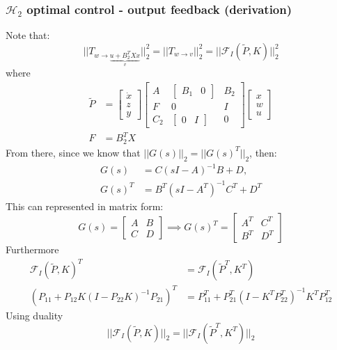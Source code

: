 \documentclass{article}
\begin{document}
\subsubsection{\texorpdfstring{$\mathcal{H}_2$}. optimal control - output feedback (derivation)}
Note that:
\[
|| T_{w \rightarrow \underbrace{u + B_2^TXx}_{v}}||_2^2 = ||T_{w \rightarrow v}||_2^2 = ||\mathcal{F}_I (\tilde P,K)||_2^2
\]
where
\[
\begin{aligned}
\tilde P &= \begin{bmatrix}
    \dot x \\ z \\ y
\end{bmatrix}
 \begin{bmatrix}
    A & \begin{bmatrix}
        B_1 & 0
    \end{bmatrix}
    & 
    B_2 \\
    F
    & 0 & I \\
    C_2 & \begin{bmatrix}
        0 & I
    \end{bmatrix}
    & 0
\end{bmatrix}
\begin{bmatrix}
    x \\ w \\ u
\end{bmatrix} \\ 
F &= B_2^TX
\end{aligned}
\]
From there, since we know that $||G(s)||_2 = ||G(s)^T||_2$, then:
\[
\begin{aligned}
G(s) &= C(sI-A)^{-1}B + D, \\ G(s)^T &= B^T(sI-A^T)^{-1}C^T + D^T
\end{aligned}
\]
This can represented in matrix form:
\[
G(s) = \begin{bmatrix}
    A & B \\ C & D
\end{bmatrix}
\implies G(s)^T = \begin{bmatrix}
    A^T & C^T \\ B^T & D^T
\end{bmatrix}
\]
Furthermore
\[
\begin{aligned}
\mathcal{F}_I(\tilde P,K)^T &= \mathcal{F}_I(\tilde P^T,K^T) \\
(P_{11} + P_{12}K(I - P_{22}K)^{-1}P_{21})^T &= P_{11}^T + P_{21}^T(I-K^TP_{22}^T)^{-1}K^TP_{12}^T
\end{aligned}
\]
Using duality
\[
||\mathcal{F}_I(\tilde P,K)||_2 = ||\mathcal{F}_I(\tilde P^T,K^T)||_2
\]
\end{document}
